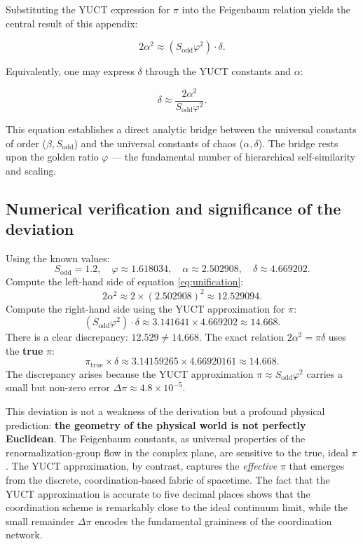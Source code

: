 \documentclass[11pt,a4paper]{article}
\begin{document}
	Substituting the YUCT expression for \(\pi\) into the Feigenbaum relation yields the central result of this appendix:
	
	\begin{equation}
		\boxed{2\alpha^2 \approx (S_{\mathrm{odd}}\varphi^2) \cdot \delta}.
		\label{eq:unification}
	\end{equation}
	
	Equivalently, one may express \(\delta\) through the YUCT constants and \(\alpha\):
	
	\begin{equation}
		\delta \approx \frac{2\alpha^2}{S_{\mathrm{odd}}\varphi^2}.
	\end{equation}
	
	This equation establishes a direct analytic bridge between the universal constants of order (\(\beta, S_{\mathrm{odd}}\)) and the universal constants of chaos (\(\alpha, \delta\)). The bridge rests upon the golden ratio \(\varphi\) — the fundamental number of hierarchical self-similarity and scaling.
	
	\subsection{Numerical verification and significance of the deviation}
	
	Using the known values:
	\[
	S_{\mathrm{odd}} = 1.2, \quad \varphi \approx 1.618034, \quad \alpha \approx 2.502908, \quad \delta \approx 4.669202.
	\]
	Compute the left-hand side of equation \eqref{eq:unification}:
	\[
	2\alpha^2 \approx 2 \times (2.502908)^2 \approx 12.529094.
	\]
	Compute the right-hand side using the YUCT approximation for \(\pi\):
	\[
	(S_{\mathrm{odd}}\varphi^2) \cdot \delta \approx 3.141641 \times 4.669202 \approx 14.668.
	\]
	There is a clear discrepancy: \(12.529 \neq 14.668\). The exact relation \(2\alpha^2 = \pi \delta\) uses the \textbf{true} \(\pi\):
	\[
	\pi_{\mathrm{true}} \times \delta \approx 3.14159265 \times 4.66920161 \approx 14.668.
	\]
	The discrepancy arises because the YUCT approximation \(\pi \approx S_{\mathrm{odd}}\varphi^2\) carries a small but non-zero error \(\Delta\pi \approx 4.8\times10^{-5}\).
	
	This deviation is not a weakness of the derivation but a profound physical prediction: \textbf{the geometry of the physical world is not perfectly Euclidean}. The Feigenbaum constants, as universal properties of the renormalization-group flow in the complex plane, are sensitive to the true, ideal \(\pi\). The YUCT approximation, by contrast, captures the \textit{effective} \(\pi\) that emerges from the discrete, coordination-based fabric of spacetime. The fact that the YUCT approximation is accurate to five decimal places shows that the coordination scheme is remarkably close to the ideal continuum limit, while the small remainder \(\Delta\pi\) encodes the fundamental graininess of the coordination network.
	
\end{document}
